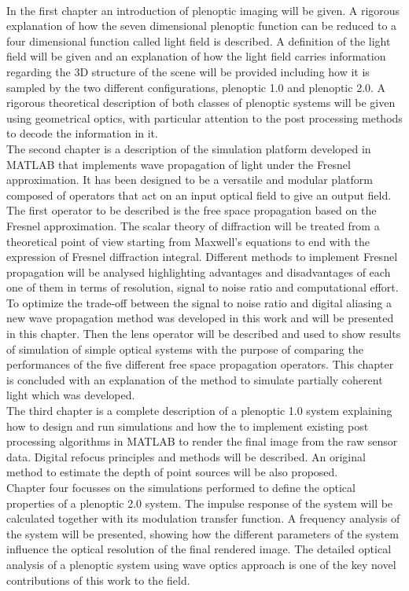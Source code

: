 \\
In the first chapter an introduction of plenoptic imaging will be given. A rigorous explanation of how the seven dimensional plenoptic function can be reduced to a four dimensional function called light field is described. A definition of the light field will be given and an explanation of how the light field carries information regarding the 3D structure of the scene will be provided including how it is sampled by the two different configurations, plenoptic 1.0 and plenoptic 2.0. A rigorous theoretical description of both classes of plenoptic systems will be given using geometrical optics, with particular attention to the post processing methods to decode the information in it. \\
The second chapter is a description of the simulation platform developed in MATLAB that implements wave propagation of light under the Fresnel approximation. It has been designed to be a versatile and modular platform composed of operators that act on an input optical field to give an output field. The first operator to be described is the free space propagation based on the Fresnel approximation. The scalar theory of diffraction will be treated from a theoretical point of view starting from Maxwell's equations to end with the expression of Fresnel diffraction integral. Different methods to implement Fresnel propagation will be analysed highlighting advantages and disadvantages of each one of them in terms of resolution, signal to noise ratio and computational effort. To optimize the trade-off between the signal to noise ratio and digital aliasing a new wave propagation method was developed in this work and will be presented in this chapter. Then the lens operator will be described and used to show results of simulation of simple optical systems with the purpose of comparing the performances of the five different free space propagation operators. This chapter is concluded with an explanation of the method to simulate partially coherent light which was developed.
\\
The third chapter is a complete description of a plenoptic 1.0 system explaining how to design and run simulations and how the to implement existing post processing algorithms in MATLAB to render the final image from the raw sensor data. Digital refocus principles and methods will be described. An original method to estimate the depth of point sources will be also proposed. 
\\
Chapter four focusses on the simulations performed to define the optical properties of a plenoptic 2.0 system. The impulse response of the system will be calculated together with its modulation transfer function. A frequency analysis of the system will be presented, showing how the different parameters of the system influence the optical resolution of the final rendered image. The detailed optical analysis of a plenoptic system using wave optics approach is one of the key novel contributions of this work to the field.
